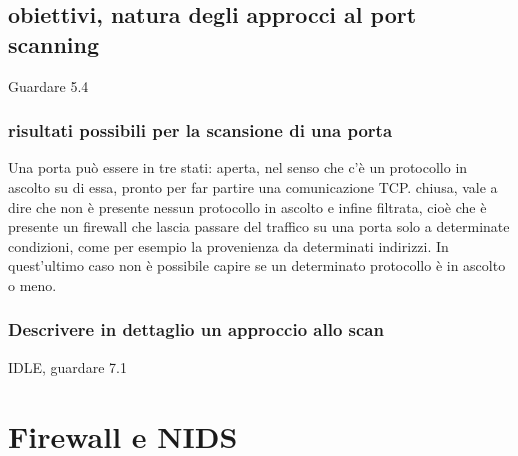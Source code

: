 \documentclass{report}
\begin{document}
\section{obiettivi, natura degli approcci al port scanning}
Guardare 5.4
\subsection{risultati possibili per la scansione di una porta}
Una porta può essere in tre stati: aperta, nel senso che c'è un protocollo in ascolto su di essa, pronto per far partire una comunicazione TCP.
chiusa, vale a dire che non è presente nessun protocollo in ascolto e infine filtrata, cioè che è presente un firewall che lascia passare del traffico
su una porta solo a determinate condizioni, come per esempio la provenienza da determinati indirizzi.
In quest'ultimo caso non è possibile capire se un determinato protocollo è in ascolto o meno.

\subsection{Descrivere in dettaglio un approccio allo scan}
IDLE, guardare 7.1




\chapter{Firewall e NIDS}
\end{document}
